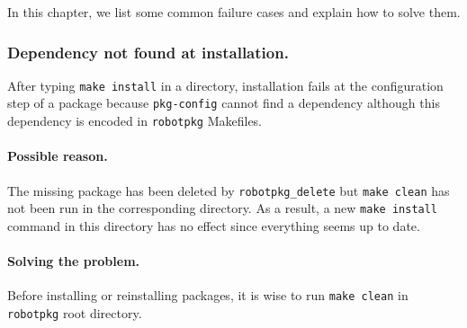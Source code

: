 %
%
%
%
%

In this chapter, we list some common failure cases and explain how to solve them.

\subsubsection*{Dependency not found at installation.}
After typing {\tt make install} in a directory, installation fails at the configuration step of a package because {\tt pkg-config} cannot find a dependency although this dependency is encoded in {\tt robotpkg} Makefiles.

\paragraph{Possible reason.} The missing package has been deleted by {\tt robotpkg\_delete} but {\tt make clean} has not been run in the corresponding directory. As a result, a new {\tt make install} command in this directory has no effect since everything seems up to date. 

\paragraph{Solving the problem.} Before installing or reinstalling packages, it is wise to run {\tt make clean} in {\tt robotpkg} root directory.